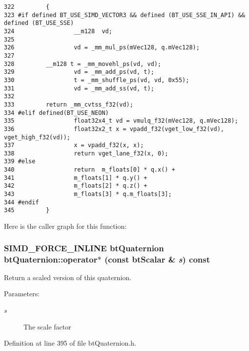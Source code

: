\begin{Code}\begin{verbatim}322         {
323 #if defined BT_USE_SIMD_VECTOR3 && defined (BT_USE_SSE_IN_API) && defined (BT_USE_SSE)
324                 __m128  vd;
325                 
326                 vd = _mm_mul_ps(mVec128, q.mVec128);
327                 
328         __m128 t = _mm_movehl_ps(vd, vd);
329                 vd = _mm_add_ps(vd, t);
330                 t = _mm_shuffle_ps(vd, vd, 0x55);
331                 vd = _mm_add_ss(vd, t);
332                 
333         return _mm_cvtss_f32(vd);
334 #elif defined(BT_USE_NEON)
335                 float32x4_t vd = vmulq_f32(mVec128, q.mVec128);
336                 float32x2_t x = vpadd_f32(vget_low_f32(vd), vget_high_f32(vd));  
337                 x = vpadd_f32(x, x);
338                 return vget_lane_f32(x, 0);
339 #else    
340                 return  m_floats[0] * q.x() + 
341                 m_floats[1] * q.y() + 
342                 m_floats[2] * q.z() + 
343                 m_floats[3] * q.m_floats[3];
344 #endif
345         }
\end{verbatim}
\end{Code}




Here is the caller graph for this function:\hypertarget{classbt_quaternion_cc3942c106bc598c0d4550d30128a7d1}{
\subsubsection[operator$\ast$]{\setlength{\rightskip}{0pt plus 5cm}SIMD\_\-FORCE\_\-INLINE {\bf btQuaternion} btQuaternion::operator$\ast$ (const btScalar \& {\em s}) const}}
\label{classbt_quaternion_cc3942c106bc598c0d4550d30128a7d1}


Return a scaled version of this quaternion. 

\begin{Desc}
\item[Parameters:]
\begin{description}
\item[{\em s}]The scale factor \end{description}
\end{Desc}


Definition at line 395 of file btQuaternion.h.

